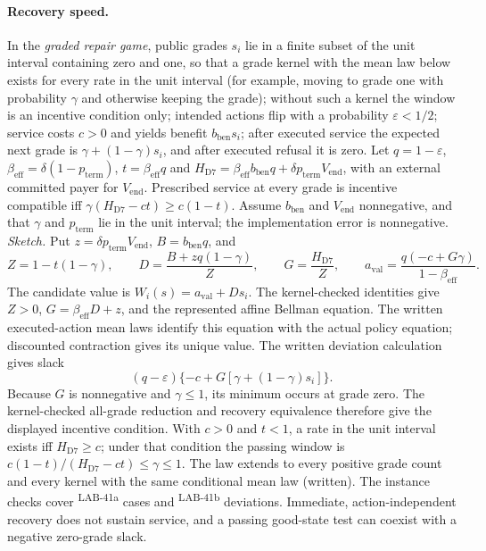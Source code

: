 \documentclass[pdflatex,sn-basic]{sn-jnl}%
\newcommand{\rec}[1]{\ifannotated\textsuperscript{\textcolor{blue!60!black}{\tiny#1}}\fi}
\begin{document}
\begin{appendices}
\paragraph{Recovery speed.} In the \emph{graded repair game}, public grades $s_i$ lie in a finite subset of the unit interval containing zero and one, so that a grade kernel with the mean law below exists for every rate in the unit interval (for example, moving to grade one with probability $\gamma$ and otherwise keeping the grade); without such a kernel the window is an incentive condition only; intended actions flip with a probability $\varepsilon<1/2$; service costs $c>0$ and yields benefit $b_{\mathrm{ben}}s_i$; after executed service the expected next grade is $\gamma+(1-\gamma)s_i$, and after executed refusal it is zero. Let $q=1-\varepsilon$, $\beta_{\mathrm{eff}}=\delta(1-p_{\mathrm{term}})$, $t=\beta_{\mathrm{eff}}q$ and $H_{\mathrm{D7}}=\beta_{\mathrm{eff}}b_{\mathrm{ben}}q+\delta p_{\mathrm{term}}V_{\mathrm{end}}$, with an external committed payer for $V_{\mathrm{end}}$. Prescribed service at every grade is incentive compatible iff $\gamma(H_{\mathrm{D7}}-ct)\ge c(1-t)$. Assume $b_{\mathrm{ben}}$ and $V_{\mathrm{end}}$ nonnegative, and that $\gamma$ and $p_{\mathrm{term}}$ lie in the unit interval; the implementation error is nonnegative. \emph{Sketch.} Put $z=\delta p_{\mathrm{term}}V_{\mathrm{end}}$, $B=b_{\mathrm{ben}}q$, and
\[
 Z=1-t(1-\gamma),\qquad D=\frac{B+zq(1-\gamma)}{Z},\qquad G=\frac{H_{\mathrm{D7}}}{Z},\qquad a_{\mathrm{val}}=\frac{q(-c+G\gamma)}{1-\beta_{\mathrm{eff}}}.
\]
The candidate value is $W_i(s)=a_{\mathrm{val}}+Ds_i$. The kernel-checked identities give $Z>0$, $G=\beta_{\mathrm{eff}}D+z$, and the represented affine Bellman equation. The written executed-action mean laws identify this equation with the actual policy equation; discounted contraction gives its unique value. The written deviation calculation gives slack
\[
 (q-\varepsilon)\{-c+G[\gamma+(1-\gamma)s_i]\}.
\]
Because $G$ is nonnegative and $\gamma\le1$, its minimum occurs at grade zero. The kernel-checked all-grade reduction and recovery equivalence therefore give the displayed incentive condition. With $c>0$ and $t<1$, a rate in the unit interval exists iff $H_{\mathrm{D7}}\ge c$; under that condition the passing window is $c(1-t)/(H_{\mathrm{D7}}-ct)\le\gamma\le1$. The law extends to every positive grade count and every kernel with the same conditional mean law (written). The instance checks cover \numDSevenCases\rec{LAB-41a} cases and \numDSevenDeviations\rec{LAB-41b} deviations. Immediate, action-independent recovery does not sustain service, and a passing good-state test can coexist with a negative zero-grade slack.


\end{appendices}
\end{document}
